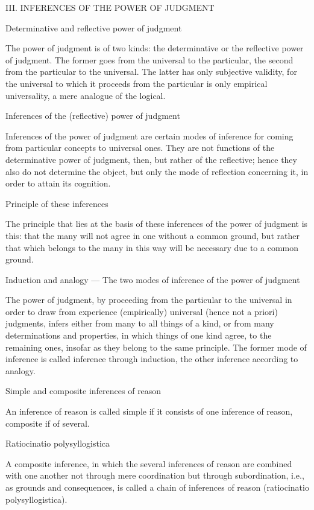 III. INFERENCES OF THE POWER OF JUDGMENT

Determinative and reflective power of judgment

The power of judgment is of two kinds:
the determinative or the reflective power of judgment.
The former goes from the universal to the particular,
the second from the particular to the universal.
The latter has only subjective validity,
for the universal to which it proceeds from the particular
is only empirical universality, a mere analogue of the logical.

Inferences of the (reflective) power of judgment

Inferences of the power of judgment are certain modes of inference for
coming from particular concepts to universal ones.
They are not functions of the determinative power of judgment, then,
but rather of the reflective;
hence they also do not determine the object,
but only the mode of reflection concerning it,
in order to attain its cognition.

Principle of these inferences

The principle that lies at the basis of these inferences of the
power of judgment is this:
that the many will not agree in one without a common ground,
but rather that which belongs to the many in this way will be
necessary due to a common ground.

Induction and analogy — The two modes of inference of the power of judgment

The power of judgment, by proceeding
from the particular to the universal
in order to draw from experience (empirically)
universal (hence not a priori) judgments,
infers either from many to all things of a kind,
or from many determinations and properties,
in which things of one kind agree,
to the remaining ones,
insofar as they belong to the same principle.
The former mode of inference is called inference through induction,
the other inference according to analogy.

Simple and composite inferences of reason

An inference of reason is called simple if it consists
of one inference of reason, composite if of several.

Ratiocinatio polysyllogistica

A composite inference, in which the several inferences of reason
are combined with one another not through mere coordination
but through subordination, i.e., as grounds and consequences,
is called a chain of inferences of reason (ratiocinatio polysyllogistica).

